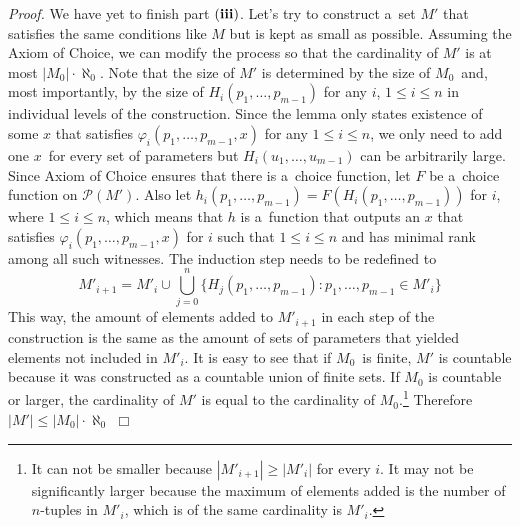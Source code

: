 \documentclass[12pt,a4paper]{article}
\newenvironment{proof}
{\noindent \textit{Proof.}}
{\hspace*{\fill} $\Box$}
\newcommand{\power}[1]{\ensuremath{\mathscr{P}} (#1)}
\begin{document}
\begin{proof}
We have yet to finish part $\bold{(iii)}$.
Let's try to construct a~set $M'$ that satisfies the same conditions like $M$ but is kept as small as possible. Assuming the Axiom of Choice, we can modify the process so that the cardinality of $M'$ is at most $|M_0| \cdot \aleph_0$. Note that the size of $M'$ is determined by the size of $M_0$ and, most importantly, by the size of $H_i(p_1, \ldots, p_{m-1})$ for any $i$, $1 \leq i \leq n$ in individual levels of the construction. Since the lemma only states existence of some $x$ that satisfies $\varphi_i(p_1, \ldots, p_{m-1}, x)$ for any $1 \leq i \leq n$, we only need to add one $x$ for every set of parameters but $H_i(u_1, \dots, u_{m-1})$ can be arbitrarily large. Since Axiom of Choice ensures that there is a~choice function, let $F$ be a~choice function on $\power{M'}$. Also let $h_i(p_1, \ldots, p_{m-1}) = F(H_i(p_1, \ldots, p_{m-1}))$ for $i$, where $1 \leq i \leq n$, which means that $h$ is a~function that outputs an $x$ that satisfies $\varphi_i(p_1, \ldots, p_{m-1}, x)$ for $i$ such that $1 \leq i \leq n$ and has minimal rank among all such witnesses. The induction step needs to be redefined to
\begin{equation}
M'_{i+1} = M'_i \cup \bigcup_{j=0}^n \{ H_j(p_1, \ldots, p_{m-1}): p_1, \ldots, p_{m-1} \in M'_i \}
\end{equation}
This way, the amount of elements added to $M'_{i+1}$ in each step of the construction is the same as the amount of sets of parameters that yielded elements not included in $M'_i$. It is easy to see that if $M_0$ is finite, $M'$ is countable because it was constructed as a countable union of finite sets. If $M_0$ is countable or larger, the cardinality of $M'$ is equal to the cardinality of $M_0$.\footnote{It can not be smaller because $|M'_{i+1}|  \geq |M'_i|$ for every $i$. It may not be significantly larger because the maximum of elements added is the number of $n$-tuples in $M'_i$, which is of the same cardinality is $M'_i$.}
Therefore $|M'| \leq |M_0| \cdot \aleph_0$
\end{proof}
\end{document}
